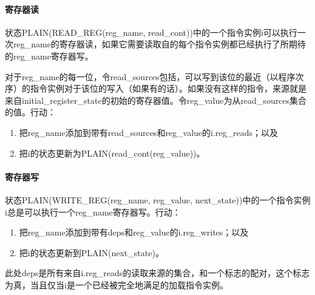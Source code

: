 \paragraph{寄存器读}\label{omm:reg_read}
状态PLAIN(READ_REG(reg_name, read_cont))中的一个指令实例i可以执行一次reg_name的寄存器读，如果它需要读取自的每个指令实例都已经执行了所期待的reg_name寄存器写。

对于reg_name的每一位，令read_sources包括，可以写到该位的最近（以程序次序）的指令实例对于该位的写入（如果有的话）。如果没有这样的指令，来源就是来自initial_register_state的初始的寄存器值。令reg_value为从read_sources集合的值。行动：
\begin{enumerate}
\item 把reg_name添加到带有read_sources和reg_value的i.reg_reads；以及 %
\item 把i的状态更新为PLAIN(read_cont(reg_value))。 %
\end{enumerate}


\paragraph{寄存器写}\label{omm:reg_write}
状态PLAIN(WRITE_REG(reg_name, reg_value, next_state))中的一个指令实例i总是可以执行一个reg_name寄存器写。行动：
\begin{enumerate}
\item 把reg_name添加到带有deps和reg_value的i.reg_writes；以及  %
\item 把i的状态更新到PLAIN(next_state)。 %
\end{enumerate}
此处deps是所有来自i.reg_reads的读取来源的集合，和一个标志的配对，这个标志为真，当且仅当i是一个已经被完全地满足的加载指令实例。


